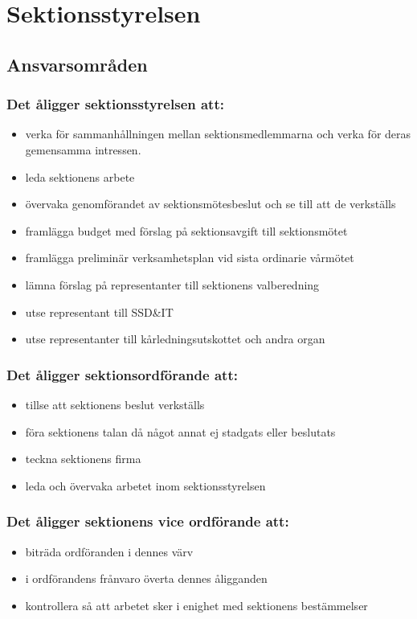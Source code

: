 \documentclass[a4paper, 10pt]{article}
\begin{document}
\section{Sektionsstyrelsen}
\subsection{Ansvarsområden}
\subsubsection{Det åligger sektionsstyrelsen att:}
\begin{itemize}
  \item verka för sammanhållningen mellan sektionsmedlemmarna och verka för deras gemensamma intressen. 
  \item leda sektionens arbete 
  \item övervaka genomförandet av sektionsmötesbeslut och se till att de verkställs 
  \item framlägga budget med förslag på sektionsavgift till sektionsmötet 
  \item framlägga preliminär verksamhetsplan vid sista ordinarie vårmötet 
  \item lämna förslag på representanter till sektionens valberedning 
  \item utse representant till SSD\&IT 
  \item utse representanter till kårledningsutskottet och andra organ 
\end{itemize}
\subsubsection{Det åligger sektionsordförande att:} 
\begin{itemize}
  \item tillse att sektionens beslut verkställs 
  \item föra sektionens talan då något annat ej stadgats eller beslutats 
  \item teckna sektionens firma 
  \item leda och övervaka arbetet inom sektionsstyrelsen 
\end{itemize}
\subsubsection{Det åligger sektionens vice ordförande att:}
\begin{itemize}
  \item biträda ordföranden i dennes värv 
  \item i ordförandens frånvaro överta dennes åligganden 
  \item kontrollera så att arbetet sker i enighet med sektionens bestämmelser 
\end{itemize}
\end{document}
